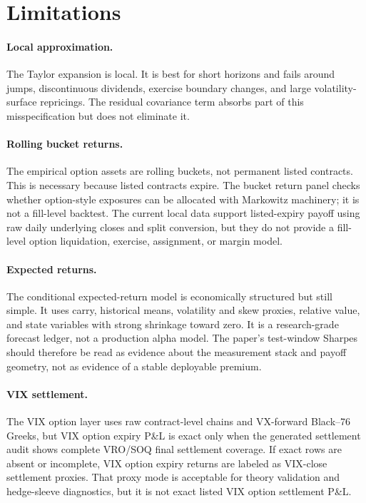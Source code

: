 \section{Limitations}

\paragraph{Local approximation.}
The Taylor expansion is local.  It is best for short horizons and fails
around jumps, discontinuous dividends, exercise boundary changes, and
large volatility-surface repricings.  The residual covariance term
absorbs part of this misspecification but does not eliminate it.

\paragraph{Rolling bucket returns.}
The empirical option assets are rolling buckets, not permanent listed
contracts.  This is necessary because listed contracts expire.  The
bucket return panel checks whether option-style exposures can be
allocated with Markowitz machinery; it is not a fill-level backtest. The
current local data support listed-expiry payoff using raw daily
underlying closes and split conversion, but they do not provide a
fill-level option liquidation, exercise, assignment, or margin model.

\paragraph{Expected returns.}
The conditional expected-return model is economically structured but still simple.  It
uses carry, historical means, volatility and skew proxies, relative value, and state
variables with strong shrinkage toward zero.  It is a research-grade forecast ledger, not
a production alpha model.  The paper's test-window Sharpes should therefore be read as
evidence about the measurement stack and payoff geometry, not as evidence of a stable
deployable premium.

\paragraph{VIX settlement.}
The VIX option layer uses raw contract-level chains and VX-forward Black--76 Greeks, but
VIX option expiry P\&L is exact only when the generated settlement audit shows complete
VRO/SOQ final settlement coverage.  If exact rows are absent or incomplete, VIX option
expiry returns are labeled as VIX-close settlement proxies.  That proxy mode is acceptable
for theory validation and hedge-sleeve diagnostics, but it is not exact listed VIX option
settlement P\&L.

